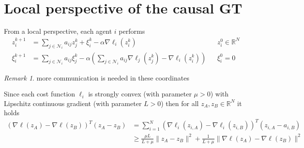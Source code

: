 \documentclass{book}
\newcommand{\R}{\mathbb{R}}
\theoremstyle{theoremv2}
\theoremstyle{defv2}
\theoremstyle{remark}
\newtheorem*{remark}{Remark}
\theoremstyle{remark}
\theoremstyle{definition}
\theoremstyle{definition}
\begin{document}
\section{Local perspective of the causal GT}
From a local perspective, each agent $i$ performs 
\begin{align*}
    z^{k+1}_i &= \displaystyle\sum_{j\in\mathcal{N}_i}a_{ij}z_j^k + \xi_i^k - \alpha\nabla\ell_i(z_i^k) && z_i^0\in\R^N\\
    \xi_i^{k+1} &= \displaystyle\sum_{j\in\mathcal{N}_i}a_{ij}\xi_j^k - \alpha\left(\displaystyle\sum_{j\in\mathcal{N}_i}a_{ij}\nabla\ell_j(z_j^k) - \nabla\ell_i(z_i^k)\right) && \xi_i^0 = 0
\end{align*}
\begin{remark}
    more communication is needed in these coordinates
\end{remark}
Since each cost function $\ell_i$ is strongly convex (with parameter $\mu>0$) with Lipschitz continuous gradient (with parameter $L>0$) then for all $z_A, z_B\in\R^N$ it holds 
\begin{align*}
    (\nabla\boldsymbol{\ell}(z_A)-\nabla\boldsymbol{\ell}(z_B))^T(z_A-z_B) &= \displaystyle\sum_{i=1}^{N} (\nabla\ell_i(z_{i,A})-\nabla\ell_i(z_{i,B}))^T(z_{i,A}-a_{i,B})\\ 
    &\geq \displaystyle\frac{\mu L}{L + \mu}\|z_A-z_B\|^2 + \displaystyle\frac{1}{L + \mu}\|\nabla\boldsymbol{\ell}(z_A)-\nabla\boldsymbol{\ell}(z_B)\|^2
\end{align*}
\end{document}
